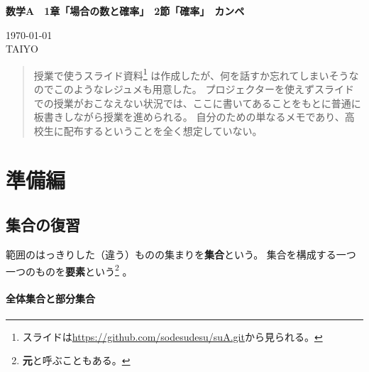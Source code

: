 \documentclass[12pt]{ltjsarticle}\usepackage{ifthen}\newcounter{enlarge}\setcounter{enlarge}{1}
\newcommand{\LS}[2]{\ifthenelse{\value{enlarge}=2 \OR \value{enlarge}=3}{#1}{#2}}
\newcommand{\LO}[1]{\LS{#1}{\relax}}
\begin{document}
{\Large%
\noindent
\textbf{%
数学A　1章「場合の数と確率」　2節「確率」　カンペ
\LO{\\ \color{teal} 〈拡大版〉}}
}

\begin{flushleft}
\today \\
TAIYO
\end{flushleft}

\begin{quotation}
授業で使うスライド資料\footnote{%
スライドは\url{https://github.com/sodesudesu/suA.git}から見られる。
}
は作成したが、何を話すか忘れてしまいそうなのでこのようなレジュメも用意した。
プロジェクターを使えずスライドでの授業がおこなえない状況では、ここに書いてあることをもとに普通に板書きしながら授業を進められる。
自分のための単なるメモであり、高校生に配布するということを全く想定していない。
\end{quotation}

\section{準備編}

\subsection{集合の復習}

範囲のはっきりした（違う）ものの集まりを\textbf{集合}という。
集合を構成する一つ一つのものを\textbf{要素}という\footnote{%
  \textbf{元}と呼ぶこともある。
}
。

\paragraph{全体集合と部分集合}
\end{document}
